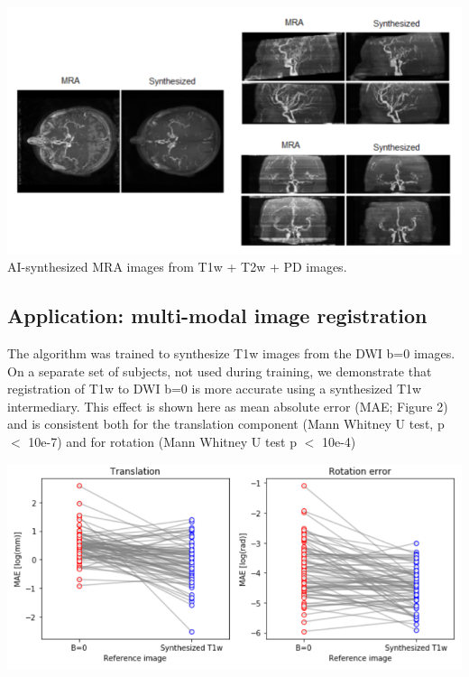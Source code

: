 \documentclass[a0, landscape]{a0poster}
\begin{document}
\begin{multicols}{3}
\begin{minipage}[t]{\linewidth}
    \includegraphics[width=\linewidth]{MRA.png}
    \center AI-synthesized MRA images from T1w + T2w + PD images.
\end{minipage}

\subsection*{Application: multi-modal image registration}

The algorithm was trained to synthesize T1w images from the DWI b=0 images. On a separate set of subjects, not used during training, we demonstrate that registration of T1w to DWI b=0 is more accurate using a synthesized T1w intermediary. This effect is shown here as mean absolute error (MAE; Figure 2) and is consistent both for the translation component (Mann Whitney U test, p $<$ 10e-7) and for rotation (Mann Whitney U test p $<$ 10e-4)

\begin{minipage}[t]{1.0\linewidth}
    \includegraphics[width=\linewidth]{motion_correction.png}
\end{minipage}


\color{SaddleBrown} %


\end{multicols}
\end{document}

